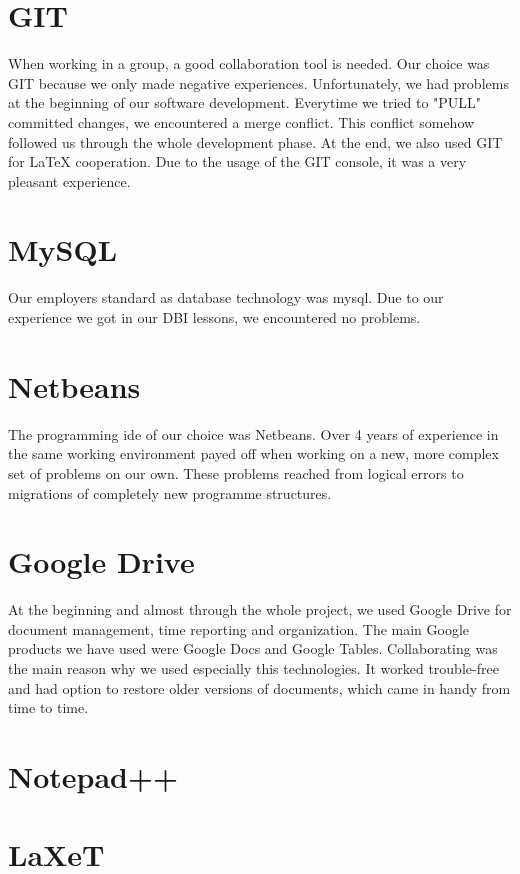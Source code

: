 \section{GIT}
When working in a group, a good collaboration tool is needed. Our choice was GIT because we only made negative experiences.\newline
Unfortunately, we had problems at the beginning of our software development. Everytime we tried to "PULL" committed changes, we encountered a merge conflict. This conflict somehow followed us through the whole development phase.\newline
At the end, we also used GIT for LaTeX cooperation. Due to the usage of the GIT console, it was a very pleasant experience.
\section{MySQL}
Our employers standard as database technology was \gls{mysql}. Due to our experience we got in our DBI lessons, we encountered no problems.
\section{Netbeans}
The programming \gls{ide} of our choice was Netbeans. Over 4 years of experience in the same working environment payed off when working on a new, more complex set of problems on our own. These problems reached from logical errors to migrations of completely new programme structures. 
\section{Google Drive}
At the beginning and almost through the whole project, we used Google Drive for document management, time reporting and organization.\newline
The main Google products we have used were Google Docs and Google Tables.\newline
Collaborating was the main reason why we used especially this technologies. It worked trouble-free and had option to restore older versions of documents, which came in handy from time to time.
\section{Notepad++}

\section{LaXeT}

